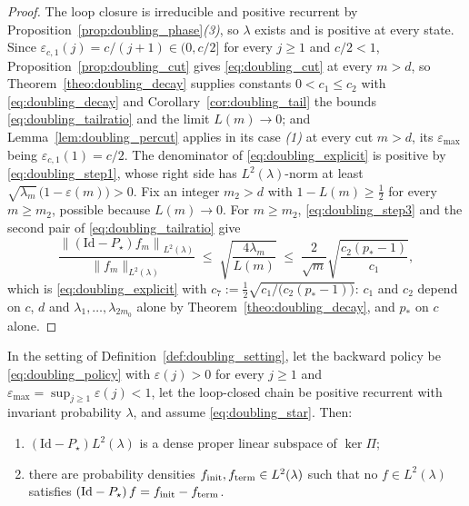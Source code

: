 \begin{proof}
The loop closure is irreducible and positive recurrent by
Proposition~\ref{prop:doubling_phase}\emph{(3)}, so $\lambda$ exists and is positive at every
state. Since $\varepsilon_{c,1}(j)=c/(j+1)\in(0,c/2]$ for every $j\geq1$ and $c/2<1$,
Proposition~\ref{prop:doubling_cut} gives \eqref{eq:doubling_cut} at every $m>d$, so
Theorem~\ref{theo:doubling_decay} supplies constants $0<c_1\leq c_2$ with
\eqref{eq:doubling_decay} and Corollary~\ref{cor:doubling_tail} the bounds
\eqref{eq:doubling_tailratio} and the limit $L(m)\rightarrow0$; and
Lemma~\ref{lem:doubling_percut} applies in its case \emph{(1)} at every cut $m>d$, its
$\varepsilon_{\max}$ being $\varepsilon_{c,1}(1)=c/2$. The denominator of
\eqref{eq:doubling_explicit} is positive by \eqref{eq:doubling_step1}, whose right side has
$L^2(\lambda)$-norm at least $\sqrt{\lambda_m}\,\bigl(1-\varepsilon(m)\bigr)>0$. Fix an
integer $m_2>d$ with $1-L(m)\geq\tfrac12$ for every $m\geq m_2$, possible because
$L(m)\rightarrow0$. For $m\geq m_2$, \eqref{eq:doubling_step3} and the second pair of
\eqref{eq:doubling_tailratio} give
\begin{equation}
    \frac{\left\|\left(\mathrm{Id}-P_\star\right)f_m\right\|_{L^2(\lambda)}}{\|f_m\|_{L^2(\lambda)}}
    \;\leq\;\sqrt{\frac{4\lambda_m}{L(m)}}
    \;\leq\;\frac{2}{\sqrt m}\sqrt{\frac{c_2(p_*-1)}{c_1}} ,
\end{equation}
which is \eqref{eq:doubling_explicit} with $c_7:=\tfrac12\sqrt{c_1/\bigl(c_2(p_*-1)\bigr)}$:
$c_1$ and $c_2$ depend on $c$, $d$ and $\lambda_1,\dots,\lambda_{2m_0}$ alone by
Theorem~\ref{theo:doubling_decay}, and $p_*$ on $c$ alone.
\end{proof}

\begin{proposition}\label{prop:doubling_unsolvable}
In the setting of Definition~\ref{def:doubling_setting}, let the backward policy be
\eqref{eq:doubling_policy} with $\varepsilon(j)>0$ for every $j\geq1$ and
$\varepsilon_{\max}=\sup_{j\geq1}\varepsilon(j)<1$, let the loop-closed chain be positive
recurrent with invariant probability $\lambda$, and assume \eqref{eq:doubling_star}. Then:
\begin{enumerate}
    \item $\left(\mathrm{Id}-P_\star\right)L^2(\lambda)$ is a dense proper linear subspace of
    $\ker\Pi$;
    \item there are probability densities $f_{\mathrm{init}},f_{\mathrm{term}}\in L^2(\lambda)$ such that no
    $f\in L^2(\lambda)$ satisfies $\left(\mathrm{Id}-P_\star\right)f=f_{\mathrm{init}}-f_{\mathrm{term}}$.
\end{enumerate}
\end{proposition}

